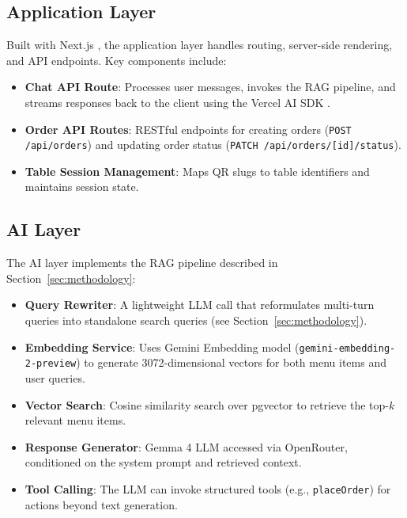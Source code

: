 \subsection{Application Layer}
Built with Next.js \cite{NextJS2024}, the application layer handles routing, server-side rendering, and API endpoints. Key components include:
\begin{itemize}
    \item \textbf{Chat API Route}: Processes user messages, invokes the RAG pipeline, and streams responses back to the client using the Vercel AI SDK \cite{VercelAISDK2024}.
    \item \textbf{Order API Routes}: RESTful endpoints for creating orders (\texttt{POST /api/orders}) and updating order status (\texttt{PATCH /api/orders/[id]/status}).
    \item \textbf{Table Session Management}: Maps QR slugs to table identifiers and maintains session state.
\end{itemize}

\subsection{AI Layer}
The AI layer implements the RAG pipeline described in Section~\ref{sec:methodology}:
\begin{itemize}
    \item \textbf{Query Rewriter}: A lightweight LLM call that reformulates multi-turn queries into standalone search queries (see Section~\ref{sec:methodology}).
    \item \textbf{Embedding Service}: Uses Gemini Embedding model (\texttt{gemini-embedding-2-preview}) to generate 3072-dimensional vectors for both menu items and user queries.
    \item \textbf{Vector Search}: Cosine similarity search over pgvector to retrieve the top-$k$ relevant menu items.
    \item \textbf{Response Generator}: Gemma 4 LLM accessed via OpenRouter, conditioned on the system prompt and retrieved context.
    \item \textbf{Tool Calling}: The LLM can invoke structured tools (e.g., \texttt{placeOrder}) for actions beyond text generation.
\end{itemize}

